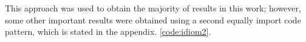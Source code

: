 This approach was used to obtain the majority of results in this work; however, some other important results were obtained using a second equally import code pattern, which is stated in the appendix. \ref{code:idiom2}.

%
%





